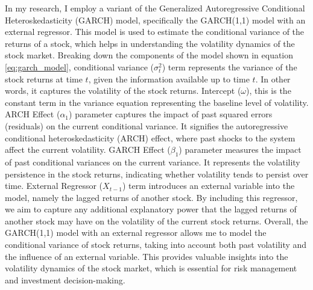 \documentclass[a4paper,12pt]{article}
\begin{document}
In my research, I employ a variant of the Generalized Autoregressive Conditional Heteroskedasticity (GARCH) model, specifically the GARCH(1,1) model with an external regressor. This model is used to estimate the conditional variance of the returns of a stock, which helps in understanding the volatility dynamics of the stock market. Breaking down the components of the model shown in equation \ref{eq:garch_model}, conditional variance ($\sigma_t^2$) term represents the variance of the stock returns at time $t$, given the information available up to time $t$. In other words, it captures the volatility of the stock returns. Intercept ($\omega$), this is the constant term in the variance equation representing the baseline level of volatility. ARCH Effect ($\alpha_1$) parameter captures the impact of past squared errors (residuals) on the current conditional variance. It signifies the autoregressive conditional heteroskedasticity (ARCH) effect, where past shocks to the system affect the current volatility. GARCH Effect ($\beta_1$) parameter measures the impact of past conditional variances on the current variance. It represents the volatility persistence in the stock returns, indicating whether volatility tends to persist over time. External Regressor ($X_{t-1}$) term introduces an external variable into the model, namely the lagged returns of another stock. By including this regressor, we aim to capture any additional explanatory power that the lagged returns of another stock may have on the volatility of the current stock returns. Overall, the GARCH(1,1) model with an external regressor allows me to model the conditional variance of stock returns, taking into account both past volatility and the influence of an external variable. This provides valuable insights into the volatility dynamics of the stock market, which is essential for risk management and investment decision-making.
\end{document}
